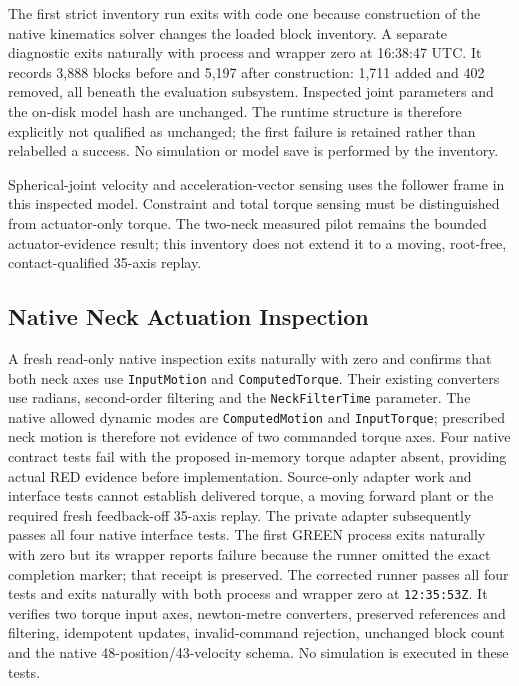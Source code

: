 \documentclass[11pt,a4paper]{article}
\begin{document}
The first strict inventory run exits with code one because construction of
the native kinematics solver changes the loaded block inventory. A separate
diagnostic exits naturally with process and wrapper zero at 16:38:47 UTC.
It records 3,888 blocks before and 5,197 after construction: 1,711 added and
402 removed, all beneath the evaluation subsystem. Inspected joint
parameters and the on-disk model hash are unchanged. The runtime structure
is therefore explicitly not qualified as unchanged; the first failure is
retained rather than relabelled a success. No simulation or model save is
performed by the inventory.

Spherical-joint velocity and acceleration-vector sensing uses the follower
frame in this inspected model. Constraint and total torque sensing must be
distinguished from actuator-only torque. The two-neck measured pilot remains
the bounded actuator-evidence result; this inventory does not extend it to
a moving, root-free, contact-qualified 35-axis replay.

\subsection{Native Neck Actuation Inspection}
A fresh read-only native inspection exits naturally with zero and confirms
that both neck axes use \texttt{InputMotion} and \texttt{ComputedTorque}.
Their existing converters use radians, second-order filtering and the
\texttt{NeckFilterTime} parameter. The native allowed dynamic modes are
\texttt{ComputedMotion} and \texttt{InputTorque}; prescribed neck motion is
therefore not evidence of two commanded torque axes. Four native contract
tests fail with the proposed in-memory torque adapter absent, providing
actual RED evidence before implementation. Source-only adapter work and
interface tests cannot establish delivered torque, a moving forward plant
or the required fresh feedback-off 35-axis replay.
The private adapter subsequently passes all four native interface tests.
The first GREEN process exits naturally with zero but its wrapper reports
failure because the runner omitted the exact completion marker; that receipt
is preserved. The corrected runner passes all four tests and exits naturally
with both process and wrapper zero at \texttt{12:35:53Z}. It verifies two torque
input axes, newton-metre converters, preserved references and filtering,
idempotent updates, invalid-command rejection, unchanged block count and the
native 48-position/43-velocity schema. No simulation is executed in these tests.
\end{document}
